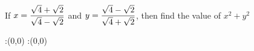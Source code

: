 

\question If $x = \dfrac{\sqrt{4}+\sqrt{2}}{\sqrt{4}-\sqrt{2}}$
and $y = \dfrac{\sqrt{4}-\sqrt{2}}{\sqrt{4}+\sqrt{2}}$, then find
the value of $x^2+y^2$

\insertQR{}

\watchout

\ifprintanswers
  \begin{marginfigure}
      :(0,0)
      :(0,0)
    \figdrawbegin{}
      \figdrawline [100,101]
    \figdrawend
    \figvisu{\figBoxA}{}{%
    }
    \centerline{\box\figBoxA}
  \end{marginfigure}
\fi 

